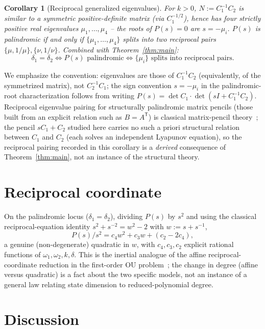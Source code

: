 \documentclass[11pt]{article}
\newtheorem{corollary}{Corollary}
\theoremstyle{definition}
\begin{document}
\begin{corollary}[Reciprocal generalized eigenvalues]
For $k>0$, $N:=C_1^{-1}C_2$ is similar to a symmetric positive-definite
matrix (via $C_1^{-1/2}$), hence has four strictly positive real
eigenvalues $\mu_1,\dots,\mu_4$ -- the roots of $P(s)=0$ are $s=-\mu_i$.
$P(s)$ is palindromic if and only if $\{\mu_1,\dots,\mu_4\}$ splits into
two reciprocal pairs $\{\mu,1/\mu\},\{\nu,1/\nu\}$. Combined with
Theorem~\ref{thm:main}:
\[
\delta_1=\delta_2 \iff P(s)\text{ palindromic} \iff \{\mu_i\}\text{ splits into reciprocal pairs.}
\]
\end{corollary}
We emphasize the convention: eigenvalues are those of $C_1^{-1}C_2$
(equivalently, of the symmetrized matrix), not $C_2^{-1}C_1$; the sign
convention $s=-\mu_i$ in the palindromic-root characterization follows
from writing $P(s)=\det C_1\cdot\det(sI+C_1^{-1}C_2)$. Reciprocal
eigenvalue pairing for structurally palindromic matrix pencils (those
built from an explicit relation such as $B=A^{\mathsf T}$) is classical
matrix-pencil theory~\cite{mackey2006}; the pencil $sC_1+C_2$ studied
here carries no such a priori structural relation between $C_1$ and
$C_2$ (each solves an independent Lyapunov equation), so the reciprocal
pairing recorded in this corollary is a \emph{derived} consequence of
Theorem~\ref{thm:main}, not an instance of the structural theory.

\section{Reciprocal coordinate}

On the palindromic locus ($\delta_1=\delta_2$), dividing $P(s)$ by $s^2$
and using the classical reciprocal-equation identity $s^2+s^{-2}=w^2-2$
with $w:=s+s^{-1}$,
\[
P(s)/s^2 = c_4w^2+c_3w+(c_2-2c_4),
\]
a genuine (non-degenerate) quadratic in $w$, with $c_4,c_3,c_2$ explicit
rational functions of $\omega_1,\omega_2,k,\delta$. This is the inertial
analogue of the affine reciprocal-coordinate reduction in the first-order
OU problem~\cite{dejesus2026heterogeneity}; the change in degree (affine
versus quadratic) is a fact about the two specific models, not an
instance of a general law relating state dimension to reduced-polynomial
degree.

\section{Discussion}
\end{document}
